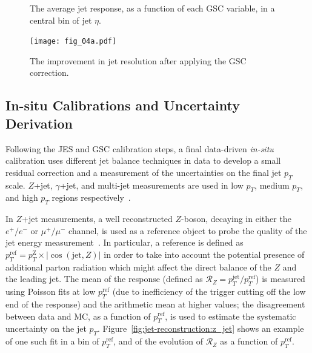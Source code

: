 \begin{figure}
\centering
{}

\label{fig:jet-reconstruction:gsc}
\caption{The average jet response, as a function of each GSC variable, in a central bin of jet $\eta$.}
\end{figure}

\begin{figure}
\centering
\texttt{[image: fig\_04a.pdf]}
\label{fig:jet-reconstruction:resolution_gsc}
\caption{The improvement in jet resolution after applying the GSC correction.}
\end{figure}


\subsection{In-situ Calibrations and Uncertainty Derivation}
\label{chapter:jet-reconstruction:insitu}

Following the JES and GSC calibration steps, a final data-driven \textit{in-situ} calibration uses different jet balance techniques in data to develop a small residual correction and a measurement of the uncertainties on the final jet $p_T$ scale. $Z$+jet, $\gamma$+jet, and multi-jet measurements are used in low $p_T$, medium $p_T$, and high $p_T$ regions respectively~\cite{ATLAS-CONF-2015-017}.

In $Z$+jet measurements, a well reconstructed $Z$-boson, decaying in either the $e^+/e^-$ or $\mu^+/\mu^-$ channel, is used as a reference object to probe the quality of the jet energy measurement~\cite{JES2011}. In particular, a reference \pt is defined as $p_T^\mathrm{ref} = p_T^\mathrm{Z} \times |\cos(\mathrm{jet}, Z) |$ in order to take into account the potential presence of additional parton radiation which might affect the direct balance of the $Z$ and the leading jet. The mean of the response (defined as $\mathcal{R}_Z = p_T^\mathrm{jet} / p_T^\mathrm{ref}$) is measured using Poisson fits at low $p_T^\mathrm{ref}$ (due to inefficiency of the trigger cutting off the low end of the response) and the arithmetic mean at higher values; the disagreement between data and MC, as a function of $p_T^\mathrm{ref}$, is used to estimate the systematic uncertainty on the jet $p_T$. Figure~\ref{fig:jet-reconstruction:z_jet} shows an example of one such fit in a bin of $p_T^\mathrm{ref}$, and of the evolution of $\mathcal{R}_Z$ as a function of $p_T^\mathrm{ref}$.

